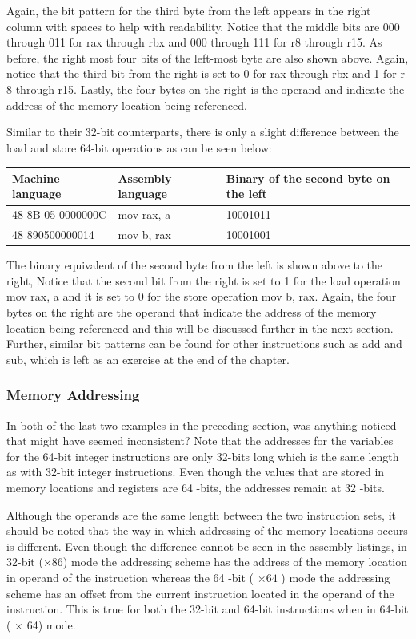 \documentclass[10pt]{article}
\begin{document}
Again, the bit pattern for the third byte from the left appears in the right column with spaces to help with readability. Notice that the middle bits are 000 through 011 for rax through rbx and 000 through 111 for r8 through r15. As before, the right most four bits of the left-most byte are also shown above. Again, notice that the third bit from the right is set to 0 for rax through rbx and 1 for r 8 through r15. Lastly, the four bytes on the right is the operand and indicate the address of the memory location being referenced.

Similar to their 32-bit counterparts, there is only a slight difference between the load and store 64-bit operations as can be seen below:

\begin{center}
\begin{tabular}{|l|l|l|}
\hline
Machine language & Assembly language & Binary of the second byte on the left \\
\hline
48 8B 05 0000000C & mov rax, a & 10001011 \\
\hline
48 890500000014 & mov b, rax & 10001001 \\
\hline
\end{tabular}
\end{center}

The binary equivalent of the second byte from the left is shown above to the right, Notice that the second bit from the right is set to 1 for the load operation mov rax, a and it is set to 0 for the store operation mov b, rax. Again, the four bytes on the right are the operand that indicate the address of the memory location being referenced and this will be discussed further in the next section. Further, similar bit patterns can be found for other instructions such as add and sub, which is left as an exercise at the end of the chapter.

\subsubsection*{Memory Addressing}
In both of the last two examples in the preceding section, was anything noticed that might have seemed inconsistent? Note that the addresses for the variables for the 64-bit integer instructions are only 32-bits long which is the same length as with 32-bit integer instructions. Even though the values that are stored in memory locations and registers are 64 -bits, the addresses remain at 32 -bits.

Although the operands are the same length between the two instruction sets, it should be noted that the way in which addressing of the memory locations occurs is different. Even though the difference cannot be seen in the assembly listings, in 32-bit (×86) mode the addressing scheme has the address of the memory location in operand of the instruction whereas the 64 -bit ( $\times 64$ ) mode the addressing scheme has an offset from the current instruction located in the operand of the instruction. This is true for both the 32-bit and 64-bit instructions when in 64-bit ( × 64) mode.
\end{document}
